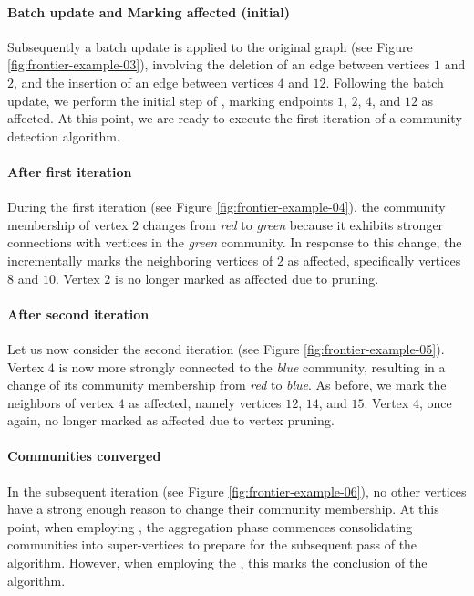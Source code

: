 \paragraph{Batch update and Marking affected (initial)}

Subsequently a batch update is applied to the original graph (see Figure \ref{fig:frontier-example-03}), involving the deletion of an edge between vertices $1$ and $2$, and the insertion of an edge between vertices $4$ and $12$. Following the batch update, we perform the initial step of \Fro{}, marking endpoints $1$, $2$, $4$, and $12$ as affected. At this point, we are ready to execute the first iteration of a community detection algorithm.

\paragraph{After first iteration}

During the first iteration (see Figure \ref{fig:frontier-example-04}), the community membership of vertex $2$ changes from \textit{red} to \textit{green} because it exhibits stronger connections with vertices in the \textit{green} community. In response to this change, the \Fro{} incrementally marks the neighboring vertices of $2$ as affected, specifically vertices $8$ and $10$. Vertex $2$ is no longer marked as affected due to pruning.

\paragraph{After second iteration}

Let us now consider the second iteration (see Figure \ref{fig:frontier-example-05}). Vertex $4$ is now more strongly connected to the \textit{blue} community, resulting in a change of its community membership from \textit{red} to \textit{blue}. As before, we mark the neighbors of vertex $4$ as affected, namely vertices $12$, $14$, and $15$. Vertex $4$, once again, no longer marked as affected due to vertex pruning.

\paragraph{Communities converged}

In the subsequent iteration (see Figure \ref{fig:frontier-example-06}), no other vertices have a strong enough reason to change their community membership. At this point, when employing \Lou{}, the aggregation phase commences consolidating communities into super-vertices to prepare for the subsequent pass of the algorithm. However, when employing the \LPA{}, this marks the conclusion of the algorithm.

